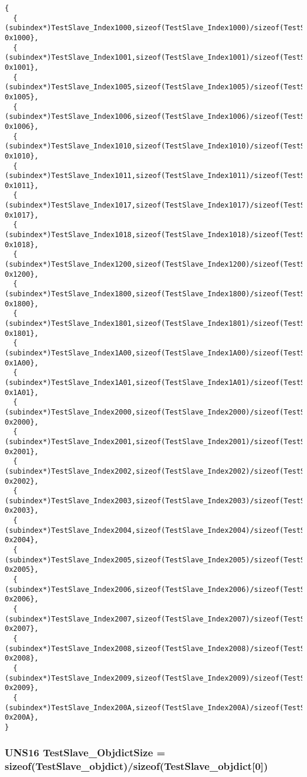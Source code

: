 \begin{Code}\begin{verbatim} 
{
  { (subindex*)TestSlave_Index1000,sizeof(TestSlave_Index1000)/sizeof(TestSlave_Index1000[0]), 0x1000},
  { (subindex*)TestSlave_Index1001,sizeof(TestSlave_Index1001)/sizeof(TestSlave_Index1001[0]), 0x1001},
  { (subindex*)TestSlave_Index1005,sizeof(TestSlave_Index1005)/sizeof(TestSlave_Index1005[0]), 0x1005},
  { (subindex*)TestSlave_Index1006,sizeof(TestSlave_Index1006)/sizeof(TestSlave_Index1006[0]), 0x1006},
  { (subindex*)TestSlave_Index1010,sizeof(TestSlave_Index1010)/sizeof(TestSlave_Index1010[0]), 0x1010},
  { (subindex*)TestSlave_Index1011,sizeof(TestSlave_Index1011)/sizeof(TestSlave_Index1011[0]), 0x1011},
  { (subindex*)TestSlave_Index1017,sizeof(TestSlave_Index1017)/sizeof(TestSlave_Index1017[0]), 0x1017},
  { (subindex*)TestSlave_Index1018,sizeof(TestSlave_Index1018)/sizeof(TestSlave_Index1018[0]), 0x1018},
  { (subindex*)TestSlave_Index1200,sizeof(TestSlave_Index1200)/sizeof(TestSlave_Index1200[0]), 0x1200},
  { (subindex*)TestSlave_Index1800,sizeof(TestSlave_Index1800)/sizeof(TestSlave_Index1800[0]), 0x1800},
  { (subindex*)TestSlave_Index1801,sizeof(TestSlave_Index1801)/sizeof(TestSlave_Index1801[0]), 0x1801},
  { (subindex*)TestSlave_Index1A00,sizeof(TestSlave_Index1A00)/sizeof(TestSlave_Index1A00[0]), 0x1A00},
  { (subindex*)TestSlave_Index1A01,sizeof(TestSlave_Index1A01)/sizeof(TestSlave_Index1A01[0]), 0x1A01},
  { (subindex*)TestSlave_Index2000,sizeof(TestSlave_Index2000)/sizeof(TestSlave_Index2000[0]), 0x2000},
  { (subindex*)TestSlave_Index2001,sizeof(TestSlave_Index2001)/sizeof(TestSlave_Index2001[0]), 0x2001},
  { (subindex*)TestSlave_Index2002,sizeof(TestSlave_Index2002)/sizeof(TestSlave_Index2002[0]), 0x2002},
  { (subindex*)TestSlave_Index2003,sizeof(TestSlave_Index2003)/sizeof(TestSlave_Index2003[0]), 0x2003},
  { (subindex*)TestSlave_Index2004,sizeof(TestSlave_Index2004)/sizeof(TestSlave_Index2004[0]), 0x2004},
  { (subindex*)TestSlave_Index2005,sizeof(TestSlave_Index2005)/sizeof(TestSlave_Index2005[0]), 0x2005},
  { (subindex*)TestSlave_Index2006,sizeof(TestSlave_Index2006)/sizeof(TestSlave_Index2006[0]), 0x2006},
  { (subindex*)TestSlave_Index2007,sizeof(TestSlave_Index2007)/sizeof(TestSlave_Index2007[0]), 0x2007},
  { (subindex*)TestSlave_Index2008,sizeof(TestSlave_Index2008)/sizeof(TestSlave_Index2008[0]), 0x2008},
  { (subindex*)TestSlave_Index2009,sizeof(TestSlave_Index2009)/sizeof(TestSlave_Index2009[0]), 0x2009},
  { (subindex*)TestSlave_Index200A,sizeof(TestSlave_Index200A)/sizeof(TestSlave_Index200A[0]), 0x200A},
}
\end{verbatim}\end{Code}
\subsubsection{\setlength{\rightskip}{0pt plus 5cm}UNS16 {\bf Test\-Slave\_\-Objdict\-Size} = sizeof({\bf Test\-Slave\_\-objdict})/sizeof({\bf Test\-Slave\_\-objdict}[0])}\label{TestSlave_8c_3f6591e8ff03215478d0c2e3c99227a6}


